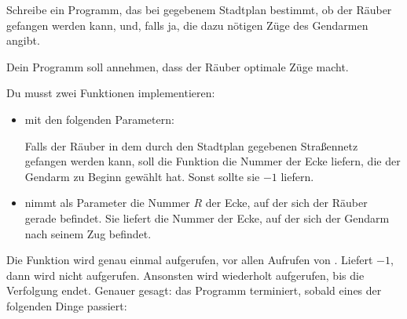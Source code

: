 \documentclass{boi2014-de}
\begin{document}
    \Task
    Schreibe ein Programm, das bei gegebenem Stadtplan bestimmt,
    ob der Räuber gefangen werden kann, und, falls ja, die dazu nötigen Züge des Gendarmen angibt.

    Dein Programm soll annehmen, dass der Räuber optimale Züge macht.

    \Implementation
    Du musst zwei Funktionen implementieren:
    \begin{itemize}
        \item {} mit den folgenden Parametern:
        
        Falls der Räuber in dem durch den Stadtplan gegebenen Straßennetz gefangen werden kann,
        soll die Funktion  die Nummer der Ecke liefern, 
        die der Gendarm zu Beginn gewählt hat.  Sonst sollte sie $-1$ liefern.

        \item {} 
            nimmt als Parameter die Nummer $R$ der Ecke, auf der sich der Räuber gerade befindet.
            Sie liefert die Nummer der Ecke, auf der sich der Gendarm nach seinem Zug befindet.
    \end{itemize}

    Die Funktion  wird genau einmal aufgerufen, vor allen Aufrufen von .
    Liefert  $-1$, dann wird   nicht aufgerufen.
    Ansonsten wird  wiederholt aufgerufen, bis die Verfolgung endet.
    Genauer gesagt:  das Programm terminiert, sobald eines der folgenden Dinge passiert:
    
\end{document}

